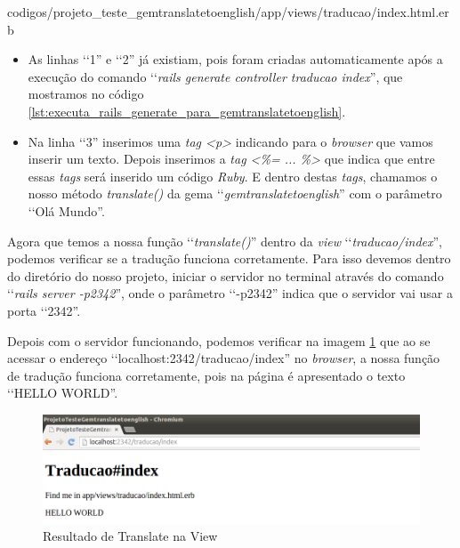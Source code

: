 
{codigos/projeto_teste_gemtranslatetoenglish/app/views/traducao/index.html.erb}

 \begin{itemize}

  \item As linhas ‘‘1'' e ‘‘2'' já existiam, pois foram criadas automaticamente após a execução do comando
  ‘‘\emph{rails generate controller traducao index}'', que mostramos no código
  \ref{lst:executa_rails_generate_para_gemtranslatetoenglish}.

  \item Na linha ‘‘3'' inserimos uma \emph{tag <p>} indicando para o \emph{browser} que vamos inserir um
  texto. Depois inserimos a \emph{tag <\%= ... \%>} que indica que entre essas \emph{tags} será inserido um
  código \emph{Ruby}. E dentro destas \emph{tags}, chamamos o nosso método \emph{translate()} da gema
  ‘‘\emph{gemtranslatetoenglish}'' com o parâmetro ‘‘Olá Mundo''.

 \end{itemize}

Agora que temos a nossa função ‘‘\emph{translate()}'' dentro da \emph{view} ‘‘\emph{traducao/index}'', podemos
verificar se a tradução funciona corretamente. Para isso devemos dentro do diretório do nosso projeto,
iniciar o servidor no terminal através do comando ‘‘\emph{rails server -p2342}'', onde o parâmetro ‘‘-p2342''
indica que o servidor vai usar a porta ‘‘2342''.

Depois com o servidor funcionando, podemos verificar na imagem \ref{fig:resultado_de_translate_na_view}
que ao se acessar o endereço ‘‘localhost:2342/traducao/index'' no \emph{browser}, a nossa função de
tradução funciona corretamente, pois na página é apresentado o texto ‘‘HELLO WORLD''.

 \begin{figure}[ht]
  \includegraphics[scale=0.49]{images/resultado_de_translate_na_view.png}
  \caption{Resultado de Translate na View}
  \label{fig:resultado_de_translate_na_view}
\end{figure}
